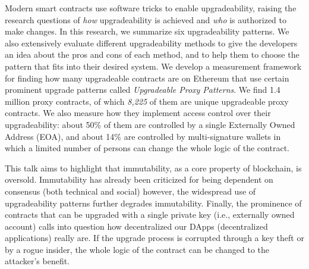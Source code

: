 \documentclass[a4paper]{article}
\begin{document}
Modern smart contracts use software tricks to enable upgradeability, raising the research questions of \textit{how} upgradeability is achieved and \textit{who} is authorized to make changes. In this research, we summarize six upgradeability patterns. We also extensively evaluate different upgradeability methods to give the developers an idea about the pros and cons of each method, and to help them to choose the pattern that fits into their desired system. 
We develop a measurement framework for finding how many upgradeable contracts are on Ethereum that use certain prominent upgrade patterns called \textit{Upgradeable Proxy Patterns}. We find 1.4 million proxy contracts, of which \textit{8,225} of them are unique upgradeable proxy contracts. We also measure how they implement access control over their upgradeability: about 50\% of them are controlled by a single Externally Owned Address (EOA), and about 14\% are controlled by multi-signature wallets in which a limited number of persons can change the whole logic of the contract.


This talk aims to highlight that immutability, as a core property of blockchain, is oversold. Immutability has already been criticized for being dependent on consensus (both technical and
social) however, the widespread use of upgradeability patterns further degrades immutability. Finally, the prominence of contracts that can be upgraded with a single private key (i.e., externally owned account) calls into question how decentralized our DApps (decentralized applications) really are. If the upgrade process is corrupted through a key theft or by a rogue insider, the whole logic of the contract can be changed to the attacker's benefit.
\end{document}
